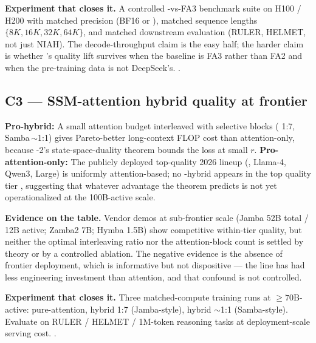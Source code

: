 \textbf{Experiment that closes it.} A controlled -vs-FA3 benchmark
suite on H100 / H200 with matched precision (BF16 or ), matched
sequence lengths $\{8K, 16K, 32K, 64K\}$, and matched downstream
evaluation (RULER, HELMET, not just NIAH). The decode-throughput claim
is the easy half; the harder claim is whether 's quality lift
survives when the baseline is FA3 rather than FA2 and when the
pre-training data is not DeepSeek's.
.

\subsection{C3 --- SSM-attention hybrid quality at frontier}
\label{sec:c-ssm}

\textbf{Pro-hybrid:} A small attention budget interleaved with
selective  blocks (\citealp{lieber2024-jamba} 1:7,
Samba\,$\sim$1:1) gives Pareto-better long-context FLOP cost than
attention-only, because -2's state-space-duality theorem
\citep[\S 3]{mamba2} bounds the loss at small $r$. \textbf{Pro-attention-only:}
The publicly deployed top-quality 2026 lineup (, Llama-4,
Qwen3,  Large) is uniformly attention-based; no -hybrid
appears in the top quality tier \citep{deepseek-v3, meta-llama4, qwen3,
jiang2023}, suggesting that whatever advantage the  theorem predicts
is not yet operationalized at the 100B-active scale.

\textbf{Evidence on the table.} Vendor demos at sub-frontier scale
(Jamba 52B total / 12B active; Zamba2 7B; Hymba 1.5B) show competitive
within-tier quality, but neither the optimal interleaving ratio nor the
attention-block count is settled by theory or by a controlled ablation.
The negative evidence is the absence of frontier deployment, which is
informative but not dispositive --- the  line has had less
engineering investment than attention, and that confound is not
controlled.

\textbf{Experiment that closes it.} Three matched-compute training runs
at $\geq 70\mathrm{B}$-active: pure-attention, hybrid 1:7
(Jamba-style), hybrid $\sim$1:1 (Samba-style). Evaluate on RULER /
HELMET / 1M-token reasoning tasks at deployment-scale serving cost.
.


